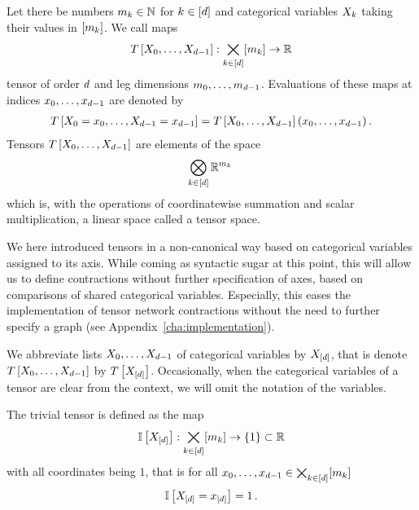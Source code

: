 \begin{definition}[Tensor]\label{def:tensor}
	Let there be numbers $m_{k}\in\mathbb{N}$ for $k\in[d]$ and categorical variables $X_{k}$ taking their values in $[m_{k}]$.
	We call maps
	\begin{align*}
		T\left[X_{0},\ldots,X_{d-1}\right] : \bigtimes_{k\in[d]} [m_{k}] \rightarrow \mathbb{R}
	\end{align*}
	tensor of order $d$ and leg dimensions $m_{0},\ldots,m_{d-1}$.
	Evaluations of these maps at indices $x_{0},\ldots,x_{d-1}$ are denoted by
	\begin{align*}
		T\left[X_{0}=x_{0},\ldots,X_{d-1}=x_{d-1}\right] = T\left[X_{0},\ldots,X_{d-1}\right](x_{0},\ldots,x_{d-1})\, .
	\end{align*}
	Tensors $T\left[X_{0},\ldots,X_{d-1}\right]$ are elements of the space
	\begin{align*}
		\bigotimes_{k\in[d]} \mathbb{R}^{m_{k}} \,
	\end{align*}
	which is, with the operations of coordinatewise summation and scalar multiplication, a linear space called a tensor space.
\end{definition}

We here introduced tensors in a non-canonical way based on categorical variables assigned to its axis.
While coming as syntactic sugar at this point, this will allow us to define contractions without further specification of axes, based on comparisons of shared categorical variables.
Especially, this eases the implementation of tensor network contractions without the need to further specify a graph (see Appendix~\ref{cha:implementation}).

We abbreviate lists $X_{0},\ldots,X_{d-1}$ of categorical variables by $X_{[d]}$, that is denote $T\left[X_{0},\ldots,X_{d-1}\right]$ by $T\left[X_{[d]}\right]$.
Occasionally, when the categorical variables of a tensor are clear from the context, we will omit the notation of the variables. %

\begin{example}\label{exa:trivialTensor}
	The trivial tensor is defined as the map
		\[ \mathbb{I}\left[X_{[d]}\right] : \bigtimes_{k\in[d]}[m_{k}] \rightarrow \{1\} \subset \mathbb{R} \]
	with all coordinates being $1$, that is for all $x_{0},\ldots,x_{d-1}\in\bigtimes_{k\in[d]}[m_{k}]$
		\[ \mathbb{I}\left[X_{[d]}=x_{[d]}\right] = 1 \, . \]
\end{example}


